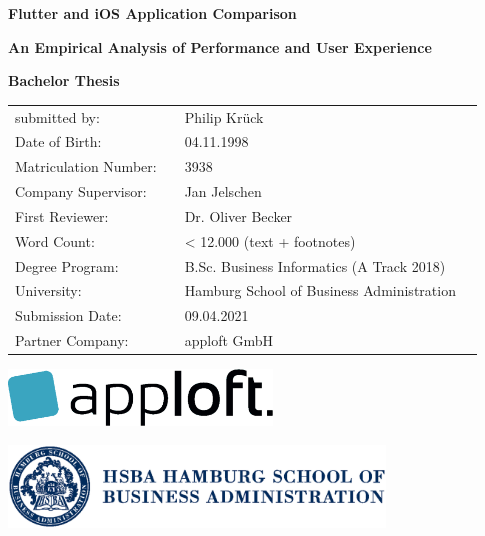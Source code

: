 \thispagestyle{empty}                  %


\begin{center}                         

\textbf{\Huge Flutter and iOS Application Comparison}

\textbf{\large An Empirical Analysis of Performance and User Experience}

\vspace{5cm}

\textbf{\huge Bachelor Thesis}

\vspace{2cm}



\large\centering\doublespacing
\hspace{1.3cm}\begin{tabular}{p{4.2cm}p{0.3cm} p{8.7cm}l}
submitted by: & & Philip Krück\\
Date of Birth: & & 04.11.1998\\
Matriculation Number: & & 3938\\
Company Supervisor: & & Jan Jelschen\\
First Reviewer: & & Dr. Oliver Becker\\
Word Count: & & < 12.000 (text + footnotes) \\
Degree Program: & & B.Sc. Business Informatics (A Track 2018)\\
University: & & Hamburg School of Business Administration\\
Submission Date: & & 09.04.2021\\
Partner Company: & & apploft GmbH\\
\end{tabular}


\vspace{2cm}

\includegraphics[width=7cm]{images/apploft.eps} %

\vspace{0.5cm}

\includegraphics[width=10cm]{images/hsba.eps} %

\end{center}
